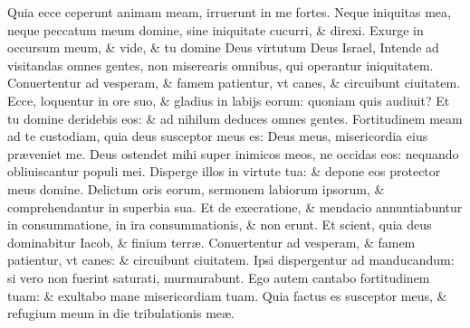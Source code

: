 \documentclass[a5paper,10pt]{book}
\def\ae{æ}
\begin{document}
\begin{multicols*}{2}
\newline \color{red} Q\color{black}uia ecce ceperunt animam meam, irruerunt in me fortes.
\newline \color{red} N\color{black}eque iniquitas mea, neque peccatum meum domine, sine iniquitate cucurri, \& direxi.
\newline \color{red} E\color{black}xurge in occursum meum, \& vide, \& tu domine Deus virtutum Deus Israel,
\newline \color{red} I\color{black}ntende ad visitandas omnes gentes, non miserearis omnibus, qui operantur iniquitatem.
\newline \color{red} C\color{black}onuertentur ad vesperam, \& famem patientur, vt canes, \& circuibunt ciuitatem.
\newline \color{red} E\color{black}cce, loquentur in ore suo, \& gladius in labijs eorum: quoniam quis audiuit?
\newline \color{red} E\color{black}t tu domine deridebis eos: \& ad nihilum deduces omnes gentes.%
\newline \color{red} F\color{black}ortitudinem meam ad te custodiam, quia deus susceptor meus es: Deus meus, misericordia eius pr\ae veniet me.
\newline \color{red} D\color{black}eus ostendet mihi super inimicos meos, ne occidas eos: nequando obliuiscantur populi mei.
\newline \color{red} D\color{black}isperge illos in virtute tua: \& depone eos protector meus domine.
\newline \color{red} D\color{black}elictum oris eorum, sermonem labiorum ipsorum, \& comprehendantur in superbia sua.
\newline \color{red} E\color{black}t de execratione, \& mendacio annuntiabuntur in consummatione, in ira consummationis, \& non erunt.
\newline \color{red} E\color{black}t scient, quia deus dominabitur Iacob, \& finium terr\ae .
\newline \color{red} C\color{black}onuertentur ad vesperam, \& famem patientur, vt canes: \& circuibunt ciuitatem.
\newline \color{red} I\color{black}psi dispergentur ad manducandum: si vero non fuerint saturati, murmurabunt.%
\newline \color{red} E\color{black}go autem cantabo fortitudinem tuam: \& exultabo mane misericordiam tuam.
\newline \color{red} Q\color{black}uia factus es susceptor meus, \& refugium meum in die tribulationis me\ae .

\end{multicols*}
\end{document}

